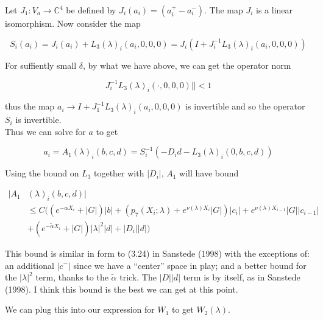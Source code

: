 \documentclass[12pt]{article}
\def\C{{\mathbb C}}
\begin{document}
\begin{enumerate}
Let $J_1: V_a \rightarrow \C^4$ be defined by $J_i(a_i) = (a_i^+ - a_i^-)$. The map $J_i$ is a linear isomorphism. Now consider the map

\[
S_i(a_i) = J_i (a_i) + L_3(\lambda)_i(a_i, 0, 0, 0) = J_i( I + J_i^{-1} L_3(\lambda)_i(a_i, 0, 0, 0))
\]

For suffiently small $\delta$, by what we have above, we can get the operator norm 

\[
J_i^{-1} L_3(\lambda)_i(\cdot, 0, 0, 0)|| < 1
\]

thus the map $a_i \rightarrow I + J_1^{-1} L_3(\lambda)_i(a_i, 0, 0, 0)$ is invertible and so the operator $S_i$ is invertible.\\

Thus we can solve for $a$ to get

\[
a_i = A_1(\lambda)_i(b, c, d) = S_i^{-1}(-D_i d - L_3(\lambda)_i(0, b, c, d))
\]

Using the bound on $L_3$ together with $|D_i|$, $A_1$ will have bound

\begin{align*}
|A_1&(\lambda)_i(b, c, d)| \\
&\leq C \Big( (e^{-\alpha X_i} + |G|) |b| 
+ ( p_7(X_i; \lambda) + e^{\nu(\lambda)X_i} |G|) |c_i| + e^{\nu(\lambda)X_{i-1}} |G| |c_{i-1}| \\
&+ (e^{-\tilde{\alpha} X_i} + |G|) |\lambda|^2 |d| + |D_i||d| \Big)
\end{align*} 

This bound is similar in form to (3.24) in Sanstede (1998) with the exceptions of: an additional $|c^-|$ since we have a ``center'' space in play; and a better bound for the $|\lambda|^2$ term, thanks to the $\tilde{\alpha}$ trick. The $|D| |d| $ term is by itself, as in Sanstede (1998). I think this bound is the best we can get at this point.

We can plug this into our expression for $W_1$ to get $W_2(\lambda)$.


\end{enumerate}
\end{document}
